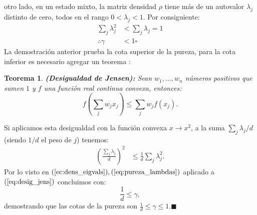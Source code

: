 \documentclass[letterpaper,12pt]{thesisECFM}
\theoremstyle{plain}
\newtheorem{thm}{Teorema}[section]
\theoremstyle{definition}
\theoremstyle{definition}
\theoremstyle{remark}
\newcommand{\1}{\mathbb{1}}
\begin{document}
otro lado, en un estado mixto, la matriz densidad $\rho$ tiene más de un
autovalor $\lambda_j$ distinto de cero, todos en el rango $0 < \lambda_j < 1$.
Por consiguiente:
    \begin{align}
        \sum_j \lambda_j^2 & < \sum_j \lambda_j =1 \\
        \therefore \gamma & < 1 \square
     \end{align}
La demostración anterior prueba la cota superior de la pureza, para la cota
inferior es necesario agregar un teorema \cite{jensen_wolfram}:
\begin{thm}
\textbf{(Desigualdad de Jensen):} \label{thm:jensen}  Sean $w_1,..., w_n$
números positivos que sumen $1$ y $f$ una función real continua convexa,
entonces:
\begin{equation}
    f \left(\sum_j w_j x_j  \right) \leq \sum_j w_j f(x_j).
\end{equation}
\end{thm}

Si aplicamos esta desigualdad con la función convexa $x \xrightarrow{}x^2$,  a
la suma $\sum_j \lambda_j /d$ (siendo $1/d$ el peso de $j$) tenemos:
    \begin{align}
    \label{eq:desig_jens}
        \left(\frac{\sum_j  \lambda_j}{d}\right)^2  & \leq \frac{1}{d} \sum_j \lambda_j^2.
    \end{align}
Por lo visto en $(\ref{ec:dens_eigvals}),(\ref{eq:pureza_lambdas})$ aplicado a $(\ref{eq:desig_jens})$ concluimos con:
\begin{equation}
    \frac{1}{d} \leq \gamma, 
\end{equation}
demostrando que las cotas de la pureza son $\frac{1}{d} \leq \gamma \leq
1$.$\blacksquare$
\end{document}
